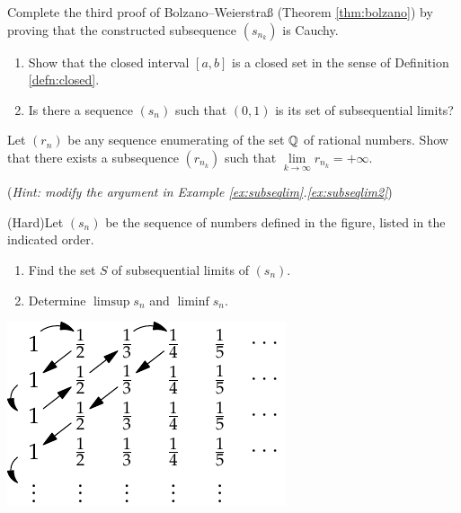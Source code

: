 \begin{exercisessec}{}{}
\begin{enumerate}
		
		\item\label{exs:bolzano} Complete the third proof of Bolzano--Weierstraß (Theorem \ref{thm:bolzano})  by proving that the constructed subsequence $(s_{n_k})$ is Cauchy.
  
  
  	\item%
  	\begin{enumerate}
  		\item Show that the closed interval $[a,b]$ is a closed set in the sense of Definition \ref{defn:closed}.
  		\item Is there a sequence $(s_n)$ such that $(0,1)$ is its set of subsequential limits?
  	\end{enumerate}
  
  
  	\item%
  	Let $(r_n)$ be any sequence enumerating of the set $\mathbb{Q}$ of rational numbers. Show that there exists a subsequence $(r_{n_k})$ such that $\lim\limits_{k\to\infty}r_{n_k}=+\infty$.\par
  	(\emph{Hint: modify the argument in Example \ref*{ex:subseqlim}.\ref{ex:subseqlim2}})
  
  
  	\begin{minipage}[t]{0.55\linewidth}\vspace{0pt}
  	\item%
  	(Hard)\lstsp Let $(s_n)$ be the sequence of numbers defined in the figure, listed in the indicated order.
  	\begin{enumerate}
		  \item Find the set $S$ of subsequential limits of $(s_n)$.
		  \item Determine $\limsup s_n$ and $\liminf s_n$.
	  \end{enumerate}
  	\end{minipage}\begin{minipage}[t]{0.44\linewidth}\vspace{0pt}
  		\hfill\includegraphics{diag-arg}
  	\end{minipage}
  
  


	\end{enumerate}
\end{exercisessec}

